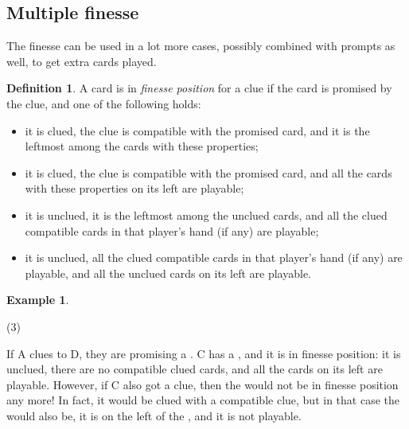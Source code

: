\documentclass[a4paper]{article}
\theoremstyle{plain}
\theoremstyle{definition}
\newtheorem{definition}[theorem]{Definition}
\newtheorem{example}[theorem]{Example}
\begin{document}
\subsection{Multiple finesse}

The finesse can be used in a lot more cases, possibly combined with prompts as well, to get extra cards played.

\begin{definition}
	\label{def:finesse-position}
	A card is in \emph{finesse position} for a clue if the card is promised by the clue, and one of the following holds:
	
	\begin{itemize}
		\item it is clued, the clue is compatible with the promised card, and it is the leftmost among the cards with these properties;
		\item it is clued, the clue is compatible with the promised card, and all the cards with these properties on its left are playable;
		\item it is unclued, it is the leftmost among the unclued cards, and all the clued compatible cards in that player's hand (if any) are playable;
		\item it is unclued, all the clued compatible cards in that player's hand (if any) are playable, and all the unclued cards on its left are playable.
	\end{itemize}
\end{definition}

\begin{example}
	\hfill
	\begin{tasks}(3)
		\task[+]      
		\task[A]    
		\task[B]    
		\task[C]    
		\task[D]    
		\task[E]    
	\end{tasks}
	
	If A clues  to D, they are promising a . C has a , and it is in finesse position: it is unclued, there are no compatible clued cards, and all the cards on its left are playable. However, if C also got a  clue, then the  would not be in finesse position any more! In fact, it would be clued with a compatible clue, but in that case the  would also be, it is on the left of the , and it is not playable.
\end{example}
\end{document}
